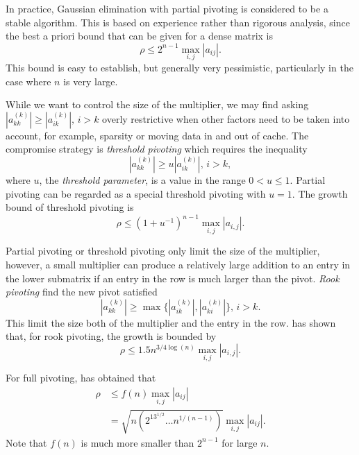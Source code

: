 \begin{exm}
    In practice, Gaussian elimination with partial pivoting is 
    considered to be a stable algorithm. This is based on 
    experience rather than rigorous analysis, since the best 
    a priori bound that can be given for a dense matrix is
    $$
        \rho\leq 2^{n-1}\max_{i,j}|a_{ij}|.
    $$ 
    This bound is easy to establish, but generally very 
    pessimistic, particularly in the case where $n$ is very 
    large.
\end{exm}

\begin{exm}
    While we want to control the size of the multiplier, we 
    may find asking $|a_{kk}^{(k)}|\geq |a_{ik}^{(k)}|,\,i>k$ 
    overly restrictive when other factors need to be taken into 
    account, for example, sparsity or moving data in and out of 
    cache. The compromise strategy is \textit{threshold 
    pivoting} which requires the inequality
    $$
        |a_{kk}^{(k)}|\geq u|a_{ik}^{(k)}|,\,i>k,
    $$ 
    where $u$, the \textit{threshold parameter}, is a value in 
    the range $0<u\leq 1$. Partial pivoting can be regarded as 
    a special threshold pivoting with $u=1$. The growth bound 
    of threshold pivoting is
    $$
        \rho\leq(1+u^{-1})^{n-1}\max_{i,j}|a_{i,j}|.
    $$ 
\end{exm}

\begin{exm}
    Partial pivoting or threshold pivoting only limit the size 
    of the multiplier, however, a small multiplier can produce 
    a relatively large addition to an entry in the lower 
    submatrix if an entry in the row is much larger than the 
    pivot. \textit{Rook pivoting} find the new pivot satisfied
    $$
        |a_{kk}^{(k)}|\geq\max\{|a_{ik}^{(k)}|,|a_{ki}^{(k)}|\},
        \,i>k.
    $$ 
    This limit the size both of the multiplier and the entry in 
    the row. \cite{Foster1997} has shown that, for rook 
    pivoting, the growth is bounded by
    $$
        \rho\leq 1.5n^{3/4\log(n)}\max_{i,j}|a_{i,j}|.
    $$ 
\end{exm}

\begin{exm}
    For full pivoting, \cite{Wilkinson1961} has obtained that 
    \begin{align*}
        \rho&\leq f(n)\max_{i,j}|a_{ij}|\\
        &=\sqrt{n(2^13^{1/2}\ldots n^{1/(n-1)})}\max_{i,j}|a_{ij}|.
    \end{align*}
    Note that $f(n)$ is much more smaller than $2^{n-1}$ for 
    large $n$.
\end{exm}

